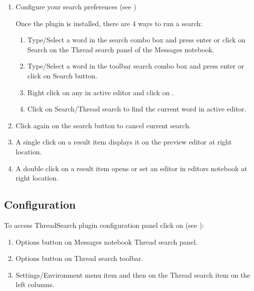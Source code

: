 \begin{enumerate}
\item Configure your search preferences (see )

Once the plugin is installed, there are 4 ways to run a search:

\begin{enumerate}
\item Type/Select a word in the search combo box and press enter or click on Search on the Thread search panel of the Messages notebook.
\item Type/Select a word in the toolbar search combo box and press enter or click on Search button.
\item Right click on any  in active editor and click on .
\item Click on Search/Thread search to find the current word in active editor.
\end{enumerate}
\item Click again on the search button to cancel current search.
\item A single click on a result item displays it on the preview editor at right location.
\item A double click on a result item opens or set an editor in editors notebook at right location.
\end{enumerate}

\subsection{Configuration}

To access ThreadSearch plugin configuration panel click on (see ):


\begin{enumerate}
\item Options button on Messages notebook Thread search panel.
\item Options button on Thread search toolbar.
\item Settings/Environment menu item and then on the Thread search item on the left columns.
\end{enumerate}


